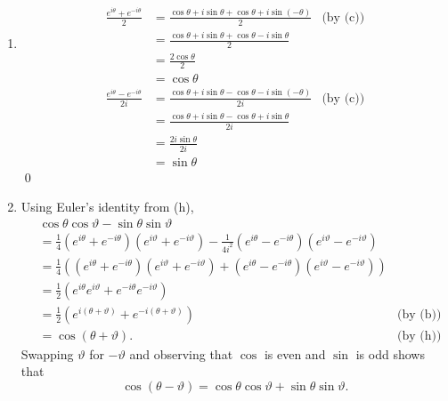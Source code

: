 \documentclass[oneside]{article}
\begin{document}
\begin{enumerate}[label=\textbf{(\alph*)}]
    \item \begin{align*}
      \frac{e^{i\theta}+e^{-i\theta}}{2}
      &= \frac{\cos\theta + i\sin\theta + \cos\theta + i\sin(-\theta)}{2}
      & \text{(by (c))}\\
      &= \frac{\cos\theta + i\sin\theta + \cos\theta - i\sin\theta}{2} \\
      &= \frac{2\cos\theta}{2} \\
      &= \cos\theta
    \end{align*}
    \begin{align*}
      \frac{e^{i\theta}-e^{-i\theta}}{2i}
      &= \frac{\cos\theta + i\sin\theta - \cos\theta - i\sin(-\theta)}{2i}
      & \text{(by (c))}\\
      &= \frac{\cos\theta + i\sin\theta - \cos\theta + i\sin\theta}{2i} \\
      &= \frac{2i\sin\theta}{2i} \\
      &= \sin\theta
    \end{align*}
    \qed

    \item Using Euler's identity from (h),\begin{align*}
      &\cos\theta\cos\vartheta - \sin\theta\sin\vartheta \\
      &= \frac14
        \left(e^{i\theta} + e^{-i\theta}\right)
        \left(e^{i\vartheta} + e^{-i\vartheta}\right)
        - \frac1{4i^2}
        \left(e^{i\theta} - e^{-i\theta}\right)
        \left(e^{i\vartheta} - e^{-i\vartheta}\right) \\
      &= \frac14\left(
        \left(e^{i\theta} + e^{-i\theta}\right)
        \left(e^{i\vartheta} + e^{-i\vartheta}\right)
        + \left(e^{i\theta} - e^{-i\theta}\right)
        \left(e^{i\vartheta} - e^{-i\vartheta}\right)\right) \\
      &= \frac12\left(
        e^{i\theta}e^{i\vartheta}
        + e^{-i\theta}e^{-i\vartheta}
        \right) \\
      &= \frac12\left(
        e^{i(\theta + \vartheta)} + e^{-i(\theta + \vartheta)}
        \right)  & \text{(by (b))} \\
      &= \cos(\theta + \vartheta) \text{.} & \text{(by (h))}
    \end{align*} Swapping $\vartheta$ for $-\vartheta$ and observing that
    $\cos$ is even and $\sin$ is odd shows that \[
      \cos(\theta  - \vartheta)
      = \cos\theta\cos\vartheta + \sin\theta\sin\vartheta \text{.}
    \]


\end{enumerate}
\end{document}
